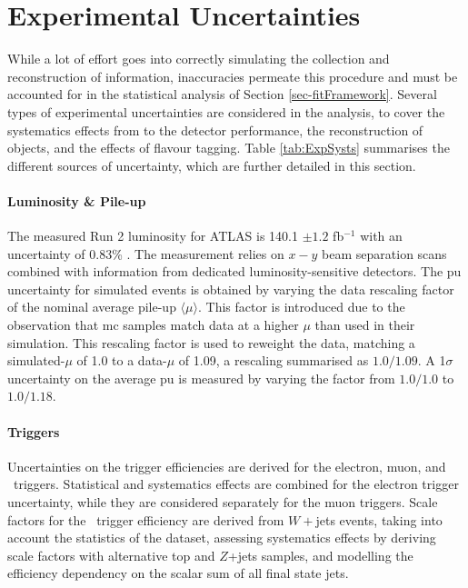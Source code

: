 \section{Experimental Uncertainties}\label{sec-unc}
While a lot of effort goes into correctly simulating the collection and reconstruction of information, inaccuracies permeate this procedure and must be accounted for in the statistical analysis of Section \ref{sec-fitFramework}. Several types of experimental uncertainties are considered in the analysis, to cover the systematics effects from to the detector performance, the reconstruction of objects, and the effects of flavour tagging. Table \ref{tab:ExpSysts} summarises the different sources of uncertainty, which are further detailed in this section.


\paragraph{Luminosity \& Pile-up} The measured Run 2 luminosity for ATLAS is 140.1 $\pm 1.2$ fb$^{-1}$ with an uncertainty of 0.83\% \cite{ATLAS:2022hro}. The measurement relies on $x-y$ beam separation scans combined with information from dedicated luminosity-sensitive detectors. The \gls{pu} uncertainty for simulated events is obtained by varying the data rescaling factor of the nominal average pile-up $\langle \mu \rangle$. This factor is introduced due to the observation that \gls{mc} samples match data at a higher $\mu$ than used in their simulation. This rescaling factor is used to reweight the data, matching a simulated-$\mu$ of 1.0 to a data-$\mu$ of 1.09, a rescaling summarised as $1.0/1.09$. A 1$\sigma$ uncertainty on the average \gls{pu} is measured by varying the factor from $1.0/1.0$ to $1.0/1.18$. %

\paragraph{Triggers} Uncertainties on the trigger efficiencies are derived for the electron, muon, and \etm\ triggers. Statistical and systematics effects are combined for the electron trigger uncertainty, while they are considered separately for the muon triggers. Scale factors for the \etm\ trigger efficiency are derived from $W+$jets events, taking into account the statistics of the dataset, assessing systematics effects by deriving scale factors with alternative top and $Z$+jets samples, and modelling the efficiency dependency on the scalar sum of all final state jets.

